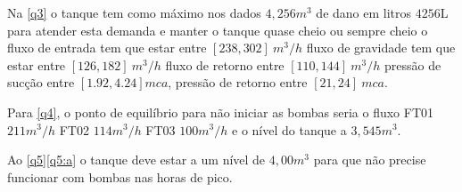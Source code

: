 %

Na \ref{q3} o tanque tem como máximo nos dados $4,256 m^3$ de dano em litros $4256$L para atender esta demanda e manter o tanque quase cheio ou sempre cheio o fluxo de entrada tem que estar entre $[238,302] \ m^3/h$ fluxo de gravidade tem que estar entre $[126,182] \ m^3/h$ fluxo de retorno entre $[110,144] \ m^3/h$ pressão de sucção entre $[1.92,4.24] mca$, pressão de retorno entre $[21,24] \ mca$.

Para \ref{q4}, o ponto de equilíbrio para não iniciar as bombas seria o fluxo FT01 $211 m^3/h$ FT02 $114 m^3/h$ FT03 $100m^3/h$ e o nível do tanque a $3,545 m^3$.

Ao \ref{q5}\ref{q5:a} o tanque deve estar a um nível de $4,00 m^3$ para que não precise funcionar com bombas nas horas de pico. 